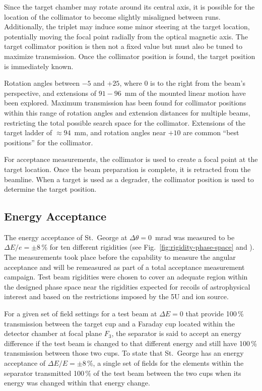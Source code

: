Since the target chamber may rotate around its central axis, it is
possible for the location of the collimator to become slightly
misaligned between runs. Additionally, the triplet may induce some minor
steering at the target location, potentially moving the focal point
radially from the optical magnetic axis. The target collimator position
is then not a fixed value but must also be tuned to maximize
transmission. Once the collimator position is found, the target position
is immediately known.

Rotation angles between $-5$ and $+25$\degree{}, where 0\degree{} is to
the right from the beam's perspective, and extensions of $91-96$~mm of
the mounted linear motion have been explored. Maximum transmission has
been found for collimator positions within this range of rotation angles
and extension distances for multiple beams, restricting the total
possible search space for the collimator. Extensions of the target
ladder of $\approx 94$~mm, and rotation angles near $+10$\degree{} are
common ``best positions'' for the collimator.

For acceptance measurements, the collimator is used to create a focal
point at the target location. Once the beam preparation is complete, it
is retracted from the beamline. When a target is used as a degrader, the
collimator position is used to determine the target position.


\subsection{Energy Acceptance}

The energy acceptance of St.\ George at $\Delta\theta = 0$~mrad was
measured to be $\Delta E/e = \pm 8$\,\% for ten different rigidities
(see Fig.~\ref{fig:rigidity-phase-space} and \cite{Meisel2017}). The
measurements took place before the capability to measure the angular
acceptance and will be remeasured as part of a total acceptance
measurement campaign. Test beam rigidities were chosen to cover an
adequate region within the designed phase space near the rigidities
expected for recoils of astrophysical interest and based on the
restrictions imposed by the 5U and ion source.

For a given set of field settings for a test beam at $\Delta E = 0$ that
provide 100\,\% transmission between the target cup and a Faraday cup
located within the detector chamber at focal plane $F_3$, the separator
is said to accept an energy difference if the test beam is changed to
that different energy and still have 100\,\% transmission between those
two cups. To state that St.\ George has an energy acceptance of $\Delta
E/E = \pm 8$\,\%, a single set of fields for the elements within the
separator transmitted 100\,\% of the test beam between the two cups when
its energy was changed within that energy change.

